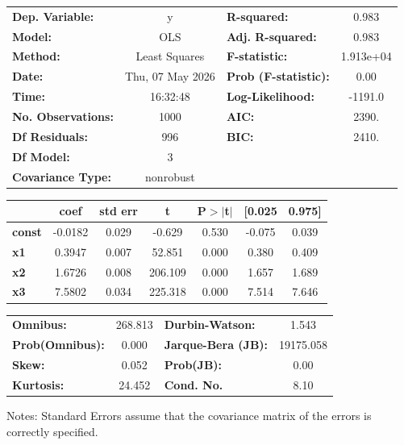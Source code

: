 \begin{center}
\begin{tabular}{lclc}
\toprule
\textbf{Dep. Variable:}    &        y         & \textbf{  R-squared:         } &     0.983   \\
\textbf{Model:}            &       OLS        & \textbf{  Adj. R-squared:    } &     0.983   \\
\textbf{Method:}           &  Least Squares   & \textbf{  F-statistic:       } & 1.913e+04   \\
\textbf{Date:}             & Thu, 07 May 2026 & \textbf{  Prob (F-statistic):} &     0.00    \\
\textbf{Time:}             &     16:32:48     & \textbf{  Log-Likelihood:    } &   -1191.0   \\
\textbf{No. Observations:} &        1000      & \textbf{  AIC:               } &     2390.   \\
\textbf{Df Residuals:}     &         996      & \textbf{  BIC:               } &     2410.   \\
\textbf{Df Model:}         &           3      & \textbf{                     } &             \\
\textbf{Covariance Type:}  &    nonrobust     & \textbf{                     } &             \\
\bottomrule
\end{tabular}
\begin{tabular}{lcccccc}
               & \textbf{coef} & \textbf{std err} & \textbf{t} & \textbf{P$> |$t$|$} & \textbf{[0.025} & \textbf{0.975]}  \\
\midrule
\textbf{const} &      -0.0182  &        0.029     &    -0.629  &         0.530        &       -0.075    &        0.039     \\
\textbf{x1}    &       0.3947  &        0.007     &    52.851  &         0.000        &        0.380    &        0.409     \\
\textbf{x2}    &       1.6726  &        0.008     &   206.109  &         0.000        &        1.657    &        1.689     \\
\textbf{x3}    &       7.5802  &        0.034     &   225.318  &         0.000        &        7.514    &        7.646     \\
\bottomrule
\end{tabular}
\begin{tabular}{lclc}
\textbf{Omnibus:}       & 268.813 & \textbf{  Durbin-Watson:     } &     1.543  \\
\textbf{Prob(Omnibus):} &   0.000 & \textbf{  Jarque-Bera (JB):  } & 19175.058  \\
\textbf{Skew:}          &   0.052 & \textbf{  Prob(JB):          } &      0.00  \\
\textbf{Kurtosis:}      &  24.452 & \textbf{  Cond. No.          } &      8.10  \\
\bottomrule
\end{tabular}
\end{center}

Notes: \newline
 [1] Standard Errors assume that the covariance matrix of the errors is correctly specified.